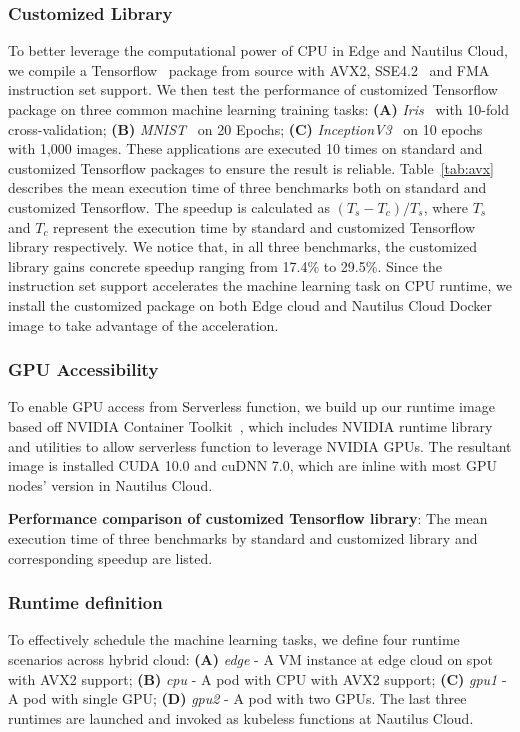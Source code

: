  \subsubsection{Customized Library}
 To better leverage the computational power of CPU in Edge and Nautilus Cloud, we compile a Tensorflow~\cite{ref:tensorflow} package from source with AVX2, SSE4.2~\cite{ref:avx} and FMA~\cite{ref:fma} instruction set support. We then test the performance of customized Tensorflow package on three common machine learning training tasks: \textbf{(A)} \textit{Iris}~\cite{ref:iris} with 10-fold cross-validation; \textbf{(B)} \textit{MNIST}~\cite{ref:mnist} on 20 Epochs; \textbf{(C)} \textit{InceptionV3}~\cite{ref:v3} on 10 epochs with 1,000 images. These applications are executed 10 times on standard and customized Tensorflow packages to ensure the result is reliable. Table~\ref{tab:avx} describes the mean execution time of three benchmarks both on standard and customized Tensorflow. The speedup is calculated as $(T_s - T_c) / T_s$, where $T_s$ and $T_c$ represent the execution time by standard and customized Tensorflow library respectively. We notice that, in all three benchmarks, the customized library gains concrete speedup ranging from 17.4\% to 29.5\%. Since the instruction set support accelerates the machine learning task on CPU runtime, we install the customized package on both Edge cloud and Nautilus Cloud Docker image to take advantage of the acceleration.
 
 \BlankLine
 \subsubsection{GPU Accessibility}
 To enable GPU access from Serverless function, we build up our runtime image based off NVIDIA Container Toolkit~\cite{ref:nvidia}, which includes NVIDIA runtime library and utilities to allow serverless function to leverage NVIDIA GPUs. The resultant image is installed CUDA 10.0 and cuDNN 7.0, which are inline with most GPU nodes' version in Nautilus Cloud. 
 
\begin{table}[]
\centering

\caption{\textbf{Performance comparison of customized Tensorflow library}: The mean execution time of three benchmarks by standard and customized library and corresponding speedup are listed.  }
\label{tab:avx}
\end{table}
 
 \BlankLine
 \subsubsection{Runtime definition}
 To effectively schedule the machine learning tasks, we define four runtime scenarios across hybrid cloud: \textbf{(A)} \textit{edge} - A VM instance at edge cloud on spot with AVX2 support; \textbf{(B)} \textit{cpu} - A pod with CPU with AVX2 support; \textbf{(C)} \textit{gpu1} - A pod with single GPU; \textbf{(D)} \textit{gpu2} - A pod with two GPUs. The last three runtimes are launched and invoked as kubeless functions at Nautilus Cloud. 
 
